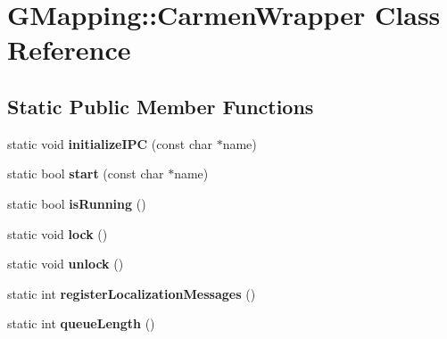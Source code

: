 \hypertarget{classGMapping_1_1CarmenWrapper}{}\section{G\+Mapping\+:\+:Carmen\+Wrapper Class Reference}
\label{classGMapping_1_1CarmenWrapper}
\subsection*{Static Public Member Functions}
\begin{DoxyCompactItemize}
\item 
\mbox{\label{classGMapping_1_1CarmenWrapper_a59c779b9645596f278fd351515380a55}} 
static void {\bfseries initialize\+I\+PC} (const char $\ast$name)
\item 
\mbox{\label{classGMapping_1_1CarmenWrapper_add38a5c0c9188755dbddca5c489e01d4}} 
static bool {\bfseries start} (const char $\ast$name)
\item 
\mbox{\label{classGMapping_1_1CarmenWrapper_a88e886218531a974b46e96fe9f23c426}} 
static bool {\bfseries is\+Running} ()
\item 
\mbox{\label{classGMapping_1_1CarmenWrapper_ac63d74d4d7992a110143df8d76114b20}} 
static void {\bfseries lock} ()
\item 
\mbox{\label{classGMapping_1_1CarmenWrapper_af5bd02bd886ace0a6a9e3010dd636865}} 
static void {\bfseries unlock} ()
\item 
\mbox{\label{classGMapping_1_1CarmenWrapper_a64ad8f8ce37da9c9bb90caa75ee27bf7}} 
static int {\bfseries register\+Localization\+Messages} ()
\item 
\mbox{\label{classGMapping_1_1CarmenWrapper_ab9847a84d39bcae31301f95da5548995}} 
static int {\bfseries queue\+Length} ()
\item 
\mbox{\label{classGMapping_1_1CarmenWrapper_afb0486ac67150f088fc95a1652518991}} 

\end{DoxyCompactItemize}
